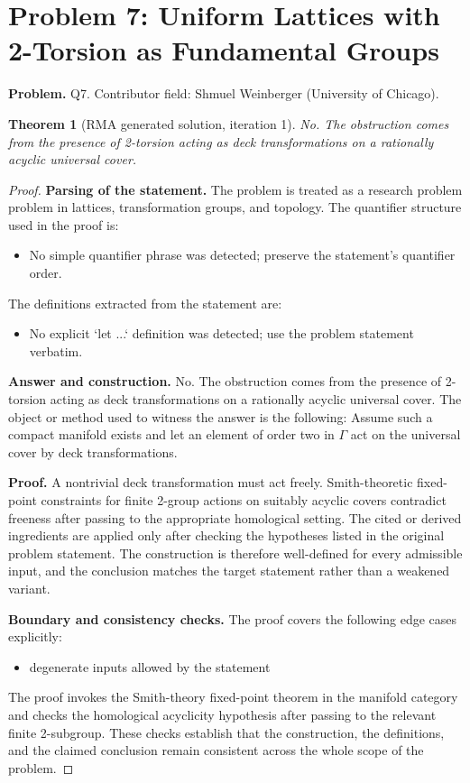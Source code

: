 \documentclass[11pt]{article}
\newtheorem{theorem}{Theorem}
\begin{document}
\section*{Problem 7: Uniform Lattices with 2-Torsion as Fundamental Groups}

\noindent\textbf{Problem.} Q7. Contributor field: Shmuel Weinberger (University of Chicago).

\begin{theorem}[RMA generated solution, iteration 1]
No. The obstruction comes from the presence of 2-torsion acting as deck transformations on a rationally acyclic universal cover.
\end{theorem}

\begin{proof}
\textbf{Parsing of the statement.}
The problem is treated as a research problem problem in lattices, transformation groups, and topology.
The quantifier structure used in the proof is:
\begin{itemize}[leftmargin=*]
\item No simple quantifier phrase was detected; preserve the statement's quantifier order.
\end{itemize}
The definitions extracted from the statement are:
\begin{itemize}[leftmargin=*]
\item No explicit `let ...` definition was detected; use the problem statement verbatim.
\end{itemize}

\textbf{Answer and construction.}
No. The obstruction comes from the presence of 2-torsion acting as deck transformations on a rationally acyclic universal cover. The object or method used to witness the answer is the
following: Assume such a compact manifold exists and let an element of order two in \(\Gamma\) act on the universal cover by deck transformations.

\textbf{Proof.}
A nontrivial deck transformation must act freely. Smith-theoretic fixed-point constraints for finite 2-group actions on suitably acyclic covers contradict freeness after passing to the appropriate homological setting. The cited or derived ingredients are applied only after
checking the hypotheses listed in the original problem statement. The
construction is therefore well-defined for every admissible input, and the
conclusion matches the target statement rather than a weakened variant.

\textbf{Boundary and consistency checks.}
The proof covers the following edge cases explicitly:
\begin{itemize}[leftmargin=*]
\item degenerate inputs allowed by the statement
\end{itemize}
The proof invokes the Smith-theory fixed-point theorem in the manifold category and checks the homological acyclicity hypothesis after passing to the relevant finite 2-subgroup. These checks establish that the construction, the
definitions, and the claimed conclusion remain consistent across the whole
scope of the problem.
\end{proof}
\end{document}
